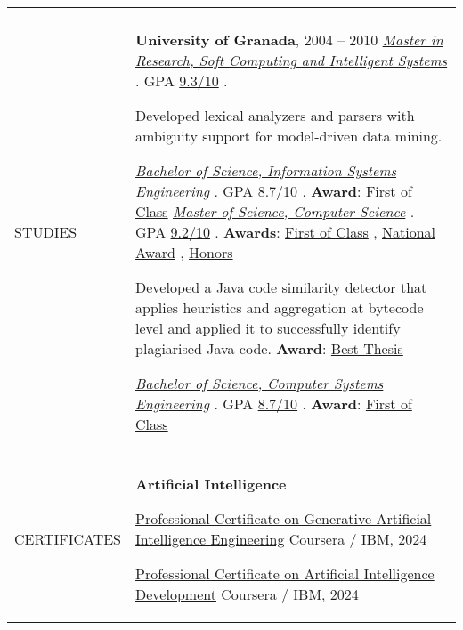\documentclass[letterpaper,10pt,oneside]{article}
\newcommand{\DatestampY}[1]{#1}
\newcommand{\itemspacingtwo}{\vspace{0.08cm}}
\newcommand{\sref}[2]{%
    \href{https://0/local/attachments/#1}{\textcolor{hiddenblue}{#2}}%
}
\newenvironment{body}
{\par\par
\begin{longtable}{p{0.145\textwidth}p{0.81\textwidth}}}
{\par\end{longtable}\par}
\renewcommand{\section}[3]{\\[-1.1cm]\pdfbookmark[2]{#2}{#3}\\%
\raggedleft  %
{\fontsize{9.5pt}{9.5pt}\selectfont\bfseries\raggedright%
\MakeUppercase{#1}}&}
\begin{document}
\begin{body}
\section{Studies}{Studies}{PDF:Studies}

\textbf{University of Granada}, \DatestampY{2004} -- \DatestampY{2010} \newline
\phantom{g}\textit{\sref{MRes-SoftComputingArtificialIntelligence-Diploma.pdf}{Master in Research, Soft Computing and Intelligent Systems}}. GPA \sref{MRes-SoftComputingArtificialIntelligence-Transcript-Spanish.pdf}{9.3/10}.
\begin{comp}
\item Developed lexical analyzers and parsers with ambiguity support for model-driven data mining.
\end{comp}
\phantom{g}\textit{\sref{BSc-ManagementInformationTechnology-Diploma.pdf}{Bachelor of Science, Information Systems Engineering}}. GPA \sref{BSc-ManagementInformationTechnology-Transcript.pdf}{8.7/10}. \textbf{Award}: \sref{BSc-ManagementInformationTechnology-Award-FirstOfPromotion.pdf}{First of Class}\newline
\phantom{g}\textit{\sref{MSc-ComputerEngineering-Diploma.pdf}{Master of Science, Computer Science}}. GPA \sref{MSc-ComputerEngineering-Transcript.pdf}{9.2/10}. \textbf{Awards}: \sref{MSc-ComputerEngineering-Award-FirstOfPromotion.pdf}{First of Class}, \sref{MSc-ComputerEngineering-Award-NationalAward.pdf}{National Award}, \sref{MSc-ComputerEngineering-Award-Distinction.pdf}{Honors}
\begin{comp}
\item Developed a Java code similarity detector that applies heuristics and aggregation at bytecode level and applied it to successfully identify plagiarised Java code. \textbf{Award}: \sref{MSc-ComputerEngineering-Award-BestMasterThesis.pdf}{Best Thesis}
\end{comp}
\phantom{g}\textit{\sref{BSc-SystemInformationTechnology-Diploma.pdf}{Bachelor of Science, Computer Systems Engineering}}. GPA \sref{BSc-SystemInformationTechnology-Transcript.pdf}{8.7/10}. \textbf{Award}: \sref{BSc-SystemInformationTechnology-Award-FirstOfPromotion.pdf}{First of Class}

\section{Certificates}{Certificates}{PDF:Certificates}
\textbf{Artificial Intelligence}
\begin{comp}
\item \sref{Certificate-Coursera-IBM-GenerativeAIEngineering.pdf}{Professional Certificate on Generative Artificial Intelligence Engineering} \textemdash{ }Coursera / IBM, \DatestampY{2024}
\item \sref{Certificate-Coursera-IBM-AIDeveloper.pdf}{Professional Certificate on Artificial Intelligence Development} \textemdash{ }Coursera / IBM, \DatestampY{2024}
\end{comp}
\itemspacingtwo


\end{body}
\end{document}
